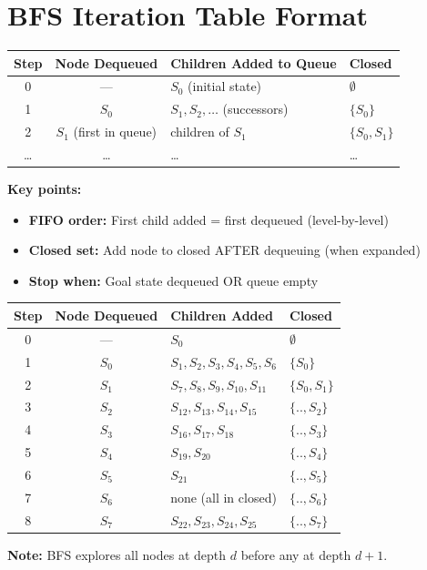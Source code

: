 \documentclass[11pt,a4paper]{article}
\begin{document}
\section{BFS Iteration Table Format}

\begin{definitionbox}
\begin{center}
\begin{tabular}{|c|c|l|l|}
\hline
\textbf{Step} & \textbf{Node Dequeued} & \textbf{Children Added to Queue} & \textbf{Closed} \\
\hline
0 & --- & $S_0$ (initial state) & $\emptyset$ \\
1 & $S_0$ & $S_1, S_2, \ldots$ (successors) & $\{S_0\}$ \\
2 & $S_1$ (first in queue) & children of $S_1$ & $\{S_0, S_1\}$ \\
\ldots & \ldots & \ldots & \ldots \\
\hline
\end{tabular}
\end{center}

\textbf{Key points:}
\begin{itemize}[leftmargin=*,nosep]
\item \textbf{FIFO order:} First child added = first dequeued (level-by-level)
\item \textbf{Closed set:} Add node to closed AFTER dequeuing (when expanded)
\item \textbf{Stop when:} Goal state dequeued OR queue empty
\end{itemize}
\end{definitionbox}

\begin{examplebox}
\begin{center}
\begin{tabular}{|c|c|l|l|}
\hline
\textbf{Step} & \textbf{Node Dequeued} & \textbf{Children Added} & \textbf{Closed} \\
\hline
0 & --- & $S_0$ & $\emptyset$ \\
1 & $S_0$ & $S_1, S_2, S_3, S_4, S_5, S_6$ & $\{S_0\}$ \\
2 & $S_1$ & $S_7, S_8, S_9, S_{10}, S_{11}$ & $\{S_0, S_1\}$ \\
3 & $S_2$ & $S_{12}, S_{13}, S_{14}, S_{15}$ & $\{.., S_2\}$ \\
4 & $S_3$ & $S_{16}, S_{17}, S_{18}$ & $\{.., S_3\}$ \\
5 & $S_4$ & $S_{19}, S_{20}$ & $\{.., S_4\}$ \\
6 & $S_5$ & $S_{21}$ & $\{.., S_5\}$ \\
7 & $S_6$ & none (all in closed) & $\{.., S_6\}$ \\
8 & $S_7$ & $S_{22}, S_{23}, S_{24}, S_{25}$ & $\{.., S_7\}$ \\
\hline
\end{tabular}
\end{center}
\textbf{Note:} BFS explores all nodes at depth $d$ before any at depth $d{+}1$.
\end{examplebox}
\end{document}
